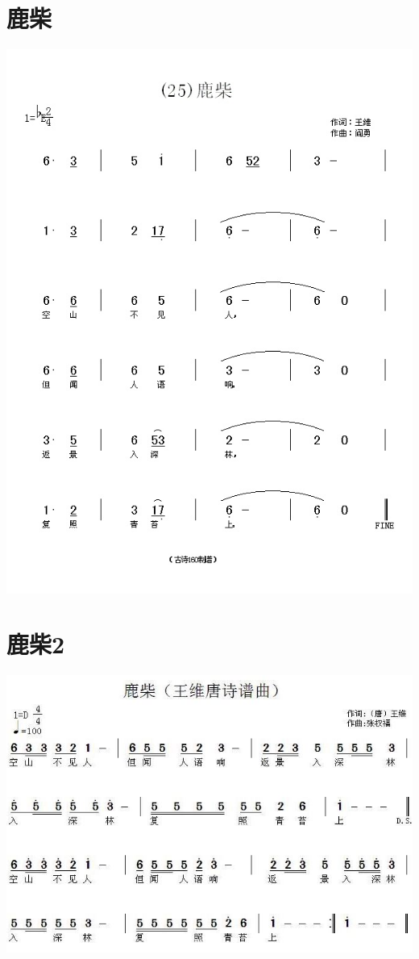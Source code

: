 \documentclass[cn,pad,chinesefont=nofont]{elegantbook}
\begin{document}
\section{鹿柴}
    \includegraphics[width=\textwidth]{dongxiao/20200627-王维-鹿柴.jpg} 
\section{鹿柴2}
    \includegraphics[width=\textwidth]{dongxiao/20200627-王维-鹿柴2.jpg} 
\end{document}
